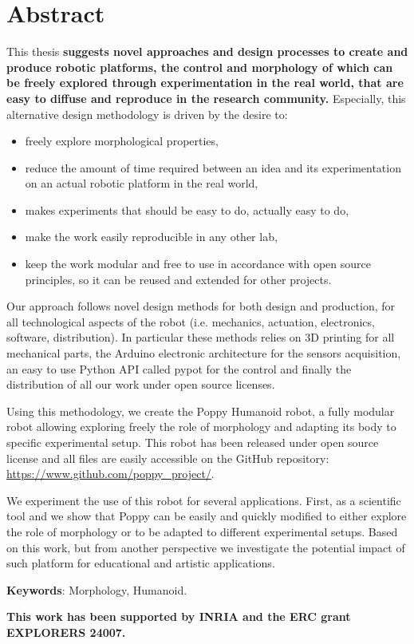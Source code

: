 %
\chapter*{Abstract}
\label{cha:abstract}
\vspace*{-10mm}

This thesis \textbf{suggests novel approaches and design processes to create and produce robotic platforms,  the control and morphology of which can be freely explored through experimentation in the real world,  that are easy to diffuse and reproduce in the research community.} Especially, this alternative design methodology is driven by the desire to:
\begin{itemize}
    \item freely explore morphological properties,
    \item reduce the amount of time required between an idea and its experimentation on an actual robotic platform in the real world,
    \item makes experiments that should be easy to do, actually easy to do,
    \item make the work easily reproducible in any other lab,
    \item keep the work modular and free to use in accordance with open source principles, so it can be reused and extended for other projects.
\end{itemize}

Our approach follows novel design methods for both design and production, for all technological aspects of the robot (i.e. mechanics, actuation, electronics, software, distribution). In particular these methods relies on 3D printing for all mechanical parts, the Arduino electronic architecture for the sensors acquisition, an easy to use Python API called pypot for the control and finally the distribution of all our work under open source licenses.

Using this methodology, we create the Poppy Humanoid robot, a fully modular robot allowing exploring freely the role of morphology and adapting its body to specific experimental setup. This robot has been released under open source license and all files are easily accessible on the GitHub repository: \url{https://www.github.com/poppy_project/}.

We experiment the use of this robot for several applications. First, as a scientific tool and we show that Poppy can be easily and quickly modified to either explore the role of morphology or to be adapted to different experimental setups.
Based on this work, but from another perspective we investigate the potential impact of such platform for educational and artistic applications.

\textbf{Keywords}: Morphology, Humanoid.

\textbf{This work has been supported by INRIA and the ERC grant EXPLORERS 24007.}

